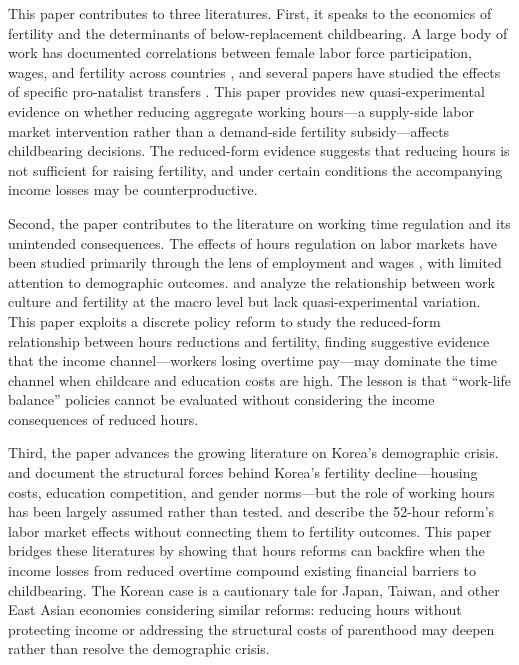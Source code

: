 \documentclass[12pt]{article}
\begin{document}
This paper contributes to three literatures. First, it speaks to the economics of fertility and the determinants of below-replacement childbearing. A large body of work has documented correlations between female labor force participation, wages, and fertility across countries \citep{galor2000ability, doepke2004accounting, luci2014impact, anderson2003demographics}, and several papers have studied the effects of specific pro-natalist transfers \citep{milligan2005subsidizing, cohen2013effect, gonzalez2013effect, raute2019can}. This paper provides new quasi-experimental evidence on whether reducing aggregate working hours---a supply-side labor market intervention rather than a demand-side fertility subsidy---affects childbearing decisions. The reduced-form evidence suggests that reducing hours is not sufficient for raising fertility, and under certain conditions the accompanying income losses may be counterproductive.

Second, the paper contributes to the literature on working time regulation and its unintended consequences. The effects of hours regulation on labor markets have been studied primarily through the lens of employment and wages \citep{hunt1999has, trejo1991effects, hamermesh2014workdays, kawaguchi2017labor, battisti2017should}, with limited attention to demographic outcomes. \citet{cygan2023work} and \citet{alesina2005work} analyze the relationship between work culture and fertility at the macro level but lack quasi-experimental variation. This paper exploits a discrete policy reform to study the reduced-form relationship between hours reductions and fertility, finding suggestive evidence that the income channel---workers losing overtime pay---may dominate the time channel when childcare and education costs are high. The lesson is that ``work-life balance'' policies cannot be evaluated without considering the income consequences of reduced hours.

Third, the paper advances the growing literature on Korea's demographic crisis. \citet{anderson2003demographics} and \citet{kim2016socioeconomic} document the structural forces behind Korea's fertility decline---housing costs, education competition, and gender norms---but the role of working hours has been largely assumed rather than tested. \citet{choi2020working} and \citet{park2019work} describe the 52-hour reform's labor market effects without connecting them to fertility outcomes. This paper bridges these literatures by showing that hours reforms can backfire when the income losses from reduced overtime compound existing financial barriers to childbearing. The Korean case is a cautionary tale for Japan, Taiwan, and other East Asian economies considering similar reforms: reducing hours without protecting income or addressing the structural costs of parenthood may deepen rather than resolve the demographic crisis.
\end{document}
